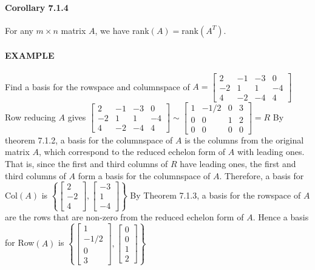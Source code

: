 \documentclass[10pt,letter]{article}
\begin{document}
\paragraph{Corollary 7.1.4} For any $m\times n$ matrix $A$, we have rank$(A)=$rank$(A^T)$. 
\paragraph{EXAMPLE} Find a basis for the rowspace and columnspace of $A=\begin{bmatrix}2&-1&-3&0\\-2&1&1&-4\\4&-2&-4&4\end{bmatrix}$ \\ 
Row reducing $A$ gives $\begin{bmatrix}2&-1&-3&0\\-2&1&1&-4\\4&-2&-4&4\end{bmatrix}\sim\begin{bmatrix}1&-1/2&0&3\\0&0&1&2\\0&0&0&0\end{bmatrix}=R$ By theorem 7.1.2, a basis for the columnspace of $A$ is the columns from the original matrix $A$, which correspond to the reduced echelon form of $A$ with leading ones. That is, since the first and third columns of $R$ have leading ones, the first and third columns of $A$ form a basis for the columnspace of $A$. Therefore, a basis for Col$(A)$ is $\left\{\begin{bmatrix}2\\-2\\4\end{bmatrix},\begin{bmatrix}-3\\1\\-4\end{bmatrix}\right\}$ By Theorem 7.1.3, a basis for the rowspace of $A$ are the rows that are non-zero from the reduced echelon form of $A$. Hence a basis for Row$(A)$ is $\left\{\begin{bmatrix}1\\-1/2\\0\\3\end{bmatrix},\begin{bmatrix}0\\0\\1\\2\end{bmatrix}\right\}$
\end{document}
